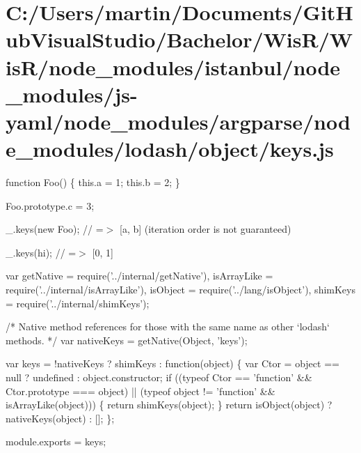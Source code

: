 \hypertarget{_c_1_2_users_2martin_2_documents_2_git_hub_visual_studio_2_bachelor_2_wis_r_2_wis_r_2node_module8c7c2fd6be818f753952181a2107b5b6}{}\section{C\+:/\+Users/martin/\+Documents/\+Git\+Hub\+Visual\+Studio/\+Bachelor/\+Wis\+R/\+Wis\+R/node\+\_\+modules/istanbul/node\+\_\+modules/js-\/yaml/node\+\_\+modules/argparse/node\+\_\+modules/lodash/object/keys.\+js}
function Foo() \{ this.\+a = 1; this.\+b = 2; \}

Foo.\+prototype.\+c = 3;

\+\_\+.\+keys(new Foo); // =$>$ \mbox{[}\textquotesingle{}a\textquotesingle{}, \textquotesingle{}b\textquotesingle{}\mbox{]} (iteration order is not guaranteed)

\+\_\+.\+keys(\textquotesingle{}hi\textquotesingle{}); // =$>$ \mbox{[}\textquotesingle{}0\textquotesingle{}, \textquotesingle{}1\textquotesingle{}\mbox{]}


\begin{DoxyCodeInclude}
var getNative = require(\textcolor{stringliteral}{'../internal/getNative'}),
    isArrayLike = require(\textcolor{stringliteral}{'../internal/isArrayLike'}),
    isObject = require(\textcolor{stringliteral}{'../lang/isObject'}),
    shimKeys = require(\textcolor{stringliteral}{'../internal/shimKeys'});

\textcolor{comment}{/* Native method references for those with the same name as other `lodash` methods. */}
var nativeKeys = getNative(Object, \textcolor{stringliteral}{'keys'});

var keys = !nativeKeys ? shimKeys : \textcolor{keyword}{function}(object) \{
  var Ctor = \textcolor{keywordtype}{object} == null ? undefined : \textcolor{keywordtype}{object}.constructor;
  \textcolor{keywordflow}{if} ((typeof Ctor == \textcolor{stringliteral}{'function'} && Ctor.prototype === \textcolor{keywordtype}{object}) ||
      (typeof \textcolor{keywordtype}{object} != \textcolor{stringliteral}{'function'} && isArrayLike(\textcolor{keywordtype}{object}))) \{
    \textcolor{keywordflow}{return} shimKeys(\textcolor{keywordtype}{object});
  \}
  \textcolor{keywordflow}{return} isObject(\textcolor{keywordtype}{object}) ? nativeKeys(\textcolor{keywordtype}{object}) : [];
\};

module.exports = keys;
\end{DoxyCodeInclude}
 